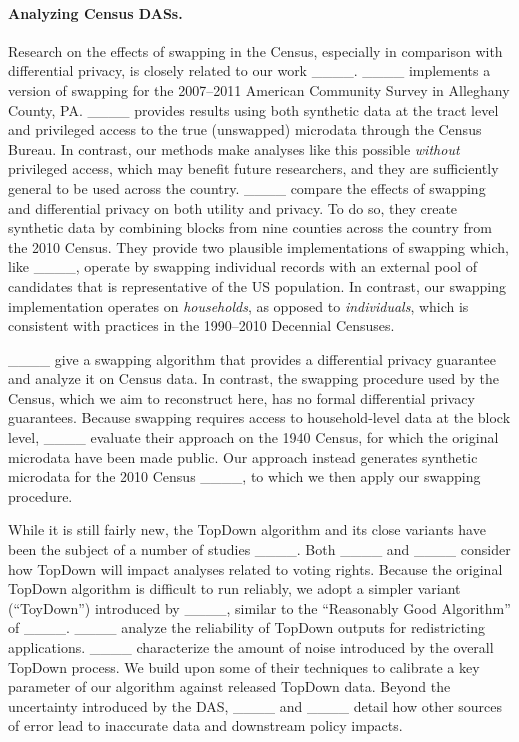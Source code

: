 \paragraph*{Analyzing Census DASs.}

Research on the effects of swapping in the Census, especially in comparison with differential privacy, is closely related to our work ____.
____ implements a version of swapping for the 2007--2011 American Community Survey in Alleghany County, PA.
____ provides results using both synthetic data at the tract level and privileged access to the true (unswapped) microdata through the Census Bureau.
In contrast, our methods make analyses like this possible \emph{without} privileged access, which may benefit future researchers, and they are sufficiently general to be used across the country.
____ compare the effects of swapping and differential privacy on both utility and privacy.
To do so, they create synthetic data by combining blocks from nine counties across the country from the 2010 Census.
They provide two plausible implementations of swapping which, like ____, operate by swapping individual records with an external pool of candidates that is representative of the US population.
In contrast, our swapping implementation operates on \textit{households}, as opposed to \textit{individuals}, which is consistent with practices in the 1990--2010 Decennial Censuses.

____ give a swapping algorithm that provides a differential privacy guarantee and analyze it on Census data.
In contrast, the swapping procedure used by the Census, which we aim to reconstruct here, has no formal differential privacy guarantees.
Because swapping requires access to household-level data at the block level, ____ evaluate their approach on the 1940 Census, for which the original microdata have been made public.
Our approach instead generates synthetic microdata for the 2010 Census ____, to which we then apply our swapping procedure.


While it is still fairly new, the TopDown algorithm and its close variants have been the subject of a number of studies ____.
Both ____ and ____ consider how TopDown will impact analyses related to voting rights.
Because the original TopDown algorithm is difficult to run reliably, we adopt a simpler variant (``ToyDown'') introduced by ____, similar to the ``Reasonably Good Algorithm'' of ____.
____ analyze the reliability of TopDown outputs for redistricting applications.
____ characterize the amount of noise introduced by the overall TopDown process.
We build upon some of their techniques to calibrate a key parameter of our algorithm against released TopDown data.
Beyond the uncertainty introduced by the DAS, ____ and ____ detail how other sources of error lead to inaccurate data and downstream policy impacts.

